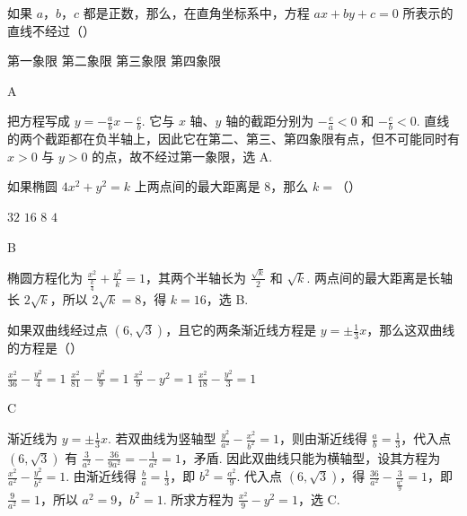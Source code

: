 \documentclass[UTF8,a4paper,oneside,11pt]{ctexbook}
\begin{document}
\begin{problem}
如果 \(a\)，\(b\)，\(c\) 都是正数，那么，在直角坐标系中，方程 \(ax+by+c=0\) 所表示的直线不经过（\quad）

\choices
    {第一象限}
    {第二象限}
    {第三象限}
    {第四象限}
\end{problem}

\begin{answer}
A
\end{answer}

\begin{solution}
把方程写成 \(y=-\frac abx-\frac cb\). 它与 \(x\) 轴、\(y\) 轴的截距分别为 \(-\frac ca<0\) 和 \(-\frac cb<0\). 直线的两个截距都在负半轴上，因此它在第二、第三、第四象限有点，但不可能同时有 \(x>0\) 与 \(y>0\) 的点，故不经过第一象限，选 A.
\end{solution}

\begin{problem}
如果椭圆 \(4x^2+y^2=k\) 上两点间的最大距离是 \(8\)，那么 \(k=\)（\quad）

\choices
    {\(32\)}
    {\(16\)}
    {\(8\)}
    {\(4\)}
\end{problem}

\begin{answer}
B
\end{answer}

\begin{solution}
椭圆方程化为 \(\frac{x^2}{\frac{k}{4}}+\frac{y^2}{k}=1\)，其两个半轴长为 \(\frac{\sqrt{k}}2\) 和 \(\sqrt{k}\). 两点间的最大距离是长轴长 \(2\sqrt{k}\)，所以 \(2\sqrt{k}=8\)，得 \(k=16\)，选 B.
\end{solution}

\begin{problem}
如果双曲线经过点 \((6,\sqrt{3})\)，且它的两条渐近线方程是 \(y=\pm \frac{1}{3}x\)，那么这双曲线的方程是（\quad）

\choices
    {\(\frac{x^2}{36}-\frac{y^2}{4}=1\)}
    {\(\frac{x^2}{81}-\frac{y^2}{9}=1\)}
    {\(\frac{x^2}{9}-y^2=1\)}
    {\(\frac{x^2}{18}-\frac{y^2}{3}=1\)}
\end{problem}

\begin{answer}
C
\end{answer}

\begin{solution}
渐近线为 \(y=\pm\frac13x\). 若双曲线为竖轴型 \(\frac{y^2}{a^2}-\frac{x^2}{b^2}=1\)，则由渐近线得 \(\frac ab=\frac13\)，代入点 \((6,\sqrt3)\) 有 \(\frac3{a^2}-\frac{36}{9a^2}=-\frac1{a^2}=1\)，矛盾. 因此双曲线只能为横轴型，设其方程为 \(\frac{x^2}{a^2}-\frac{y^2}{b^2}=1\). 由渐近线得 \(\frac ba=\frac13\)，即 \(b^2=\frac{a^2}{9}\). 代入点 \((6,\sqrt3)\)，得 \(\frac{36}{a^2}-\frac{3}{\frac{a^2}{9}}=1\)，即 \(\frac9{a^2}=1\)，所以 \(a^2=9\)，\(b^2=1\). 所求方程为 \(\frac{x^2}{9}-y^2=1\)，选 C.
\end{solution}
\end{document}
